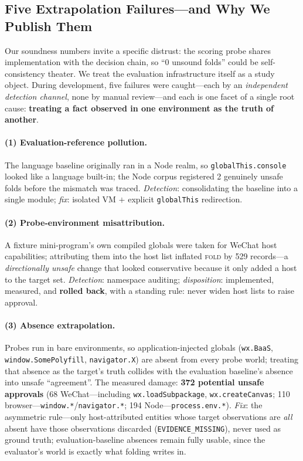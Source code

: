 \documentclass[sigconf,nonacm]{acmart}
\begin{document}
\subsection{Five Extrapolation Failures---and Why We Publish Them}

Our soundness numbers invite a specific distrust: the scoring probe shares implementation with the decision chain, so ``0 unsound folds'' could be self-consistency theater. We treat the evaluation infrastructure itself as a study object. During development, five failures were caught---each by an \emph{independent detection channel}, none by manual review---and each is one facet of a single root cause: \textbf{treating a fact observed in one environment as the truth of another}.

\paragraph{(1) Evaluation-reference pollution.} The language baseline originally ran in a Node realm, so \texttt{globalThis.console} looked like a language built-in; the Node corpus registered 2 genuinely unsafe folds before the mismatch was traced. \emph{Detection}: consolidating the baseline into a single module; \emph{fix}: isolated VM $+$ explicit \texttt{globalThis} redirection.

\paragraph{(2) Probe-environment misattribution.} A fixture mini-program's own compiled globals were taken for WeChat host capabilities; attributing them into the host list inflated \textsc{fold} by 529 records---a \emph{directionally unsafe} change that looked conservative because it only added a host to the target set. \emph{Detection}: namespace auditing; \emph{disposition}: implemented, measured, and \textbf{rolled back}, with a standing rule: never widen host lists to raise approval.

\paragraph{(3) Absence extrapolation.} Probes run in bare environments, so application-injected globals (\texttt{wx.BaaS}, \texttt{window.SomePolyfill}, \texttt{navigator.X}) are absent from every probe world; treating that absence as the target's truth collides with the evaluation baseline's absence into unsafe ``agreement''. The measured damage: \textbf{372 potential unsafe approvals} (68 WeChat---including \texttt{wx.loadSubpackage}, \texttt{wx.createCanvas}; 110 browser---\texttt{window.*}/\texttt{navigator.*}; 194 Node---\texttt{process.env.*}). \emph{Fix}: the asymmetric rule---only host-attributed entities whose target observations are \emph{all} absent have those observations discarded (\texttt{EVIDENCE\_MISSING}), never used as ground truth; evaluation-baseline absences remain fully usable, since the evaluator's world is exactly what folding writes in.
\end{document}
